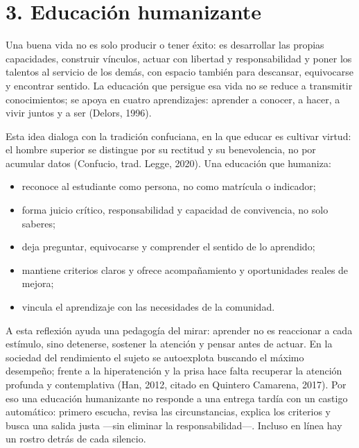 \documentclass[12pt]{article}
\newcommand{\cita}[1]{\textup{(#1)}}
\begin{document}
\section*{3. Educación humanizante}

Una buena vida no es solo producir o tener éxito: es desarrollar las propias capacidades,
construir vínculos, actuar con libertad y responsabilidad y poner los talentos al servicio
de los demás, con espacio también para descansar, equivocarse y encontrar sentido. La
educación que persigue esa vida no se reduce a transmitir conocimientos; se apoya en
cuatro aprendizajes: aprender a conocer, a hacer, a vivir juntos y a ser
\cita{Delors, 1996}.

Esta idea dialoga con la tradición confuciana, en la que educar es cultivar virtud: el
hombre superior se distingue por su rectitud y su benevolencia, no por acumular datos
\cita{Confucio, trad. Legge, 2020}. Una educación que humaniza:

\begin{itemize}[leftmargin=1.4em,itemsep=1pt,topsep=2pt]
  \item reconoce al estudiante como persona, no como matrícula o indicador;
  \item forma juicio crítico, responsabilidad y capacidad de convivencia, no solo saberes;
  \item deja preguntar, equivocarse y comprender el sentido de lo aprendido;
  \item mantiene criterios claros y ofrece acompañamiento y oportunidades reales de mejora;
  \item vincula el aprendizaje con las necesidades de la comunidad.
\end{itemize}

A esta reflexión ayuda una pedagogía del mirar: aprender no es reaccionar a cada estímulo,
sino detenerse, sostener la atención y pensar antes de actuar. En la sociedad del
rendimiento el sujeto se autoexplota buscando el máximo desempeño; frente a la
hiperatención y la prisa hace falta recuperar la atención profunda y contemplativa
\cita{Han, 2012, citado en Quintero Camarena, 2017}. Por eso una educación humanizante no
responde a una entrega tardía con un castigo automático: primero escucha, revisa las
circunstancias, explica los criterios y busca una salida justa ---sin eliminar la
responsabilidad---. Incluso en línea hay un rostro detrás de cada silencio.
\end{document}
